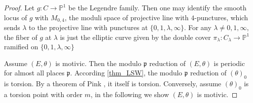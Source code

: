 \documentclass[12pt,twoside]{book}
\theoremstyle{plain}
\theoremstyle{definition}
\theoremstyle{remark}
\newcommand{\frakp}{{\mathfrak p}}
\newcommand{\bP}{{\mathbb P}}
\numberwithin{equation}{section}
\begin{document}
\begin{proof}
Let $g\colon C\to \bP^1$ be the Legendre family. Then one may identify the smooth locus of $g$ with $M_{0,4}$, the moduli space of projective line with $4$-punctures, which sends $\lambda$ to the projective line with punctures at $\{0,1,\lambda,\infty\}$. For any $\lambda\neq 0,1,\infty$, the fiber of $g$ at $\lambda$ is just the elliptic curve given by the double cover $\pi_\lambda\colon C_\lambda\to \bP^1$ ramified on $\{0,1,\lambda,\infty\}$



Assume $(E,\theta)$ is motivic. Then the modulo $\frakp$ reduction of $(E,\theta)$ is periodic for almost all places $\frakp$. According \autoref{thm_LSW}, the modulo $\frakp$ reduction of $(\theta)_0$ is torsion. By a theorem of Pink \cite{Pin04}, it itself is torsion. Conversely, assume $(\theta)_0$ is a torsion point with order $m$, in the following we show $(E,\theta)$ is motivic.


\end{proof}
\end{document}
